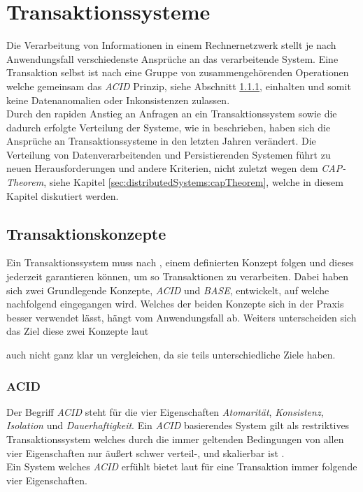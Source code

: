 \chapter{Transaktionssysteme}
Die Verarbeitung von Informationen in einem Rechnernetzwerk stellt je nach Anwendungsfall verschiedenste Ansprüche an das verarbeitende System. Eine Transaktion selbst ist nach \cite{rahm1993HochleistungsTransaktionssysteme} eine Gruppe von zusammengehörenden Operationen welche gemeinsam das \textit{ACID} Prinzip, siehe Abschnitt \ref{sec:transactionTheory:acid}, einhalten und somit keine Datenanomalien oder Inkonsistenzen zulassen. \\
Durch den rapiden Anstieg an Anfragen an ein Transaktionssystem sowie die dadurch erfolgte Verteilung der Systeme, wie in \cite{li2017research} beschrieben, haben sich die Ansprüche an Transaktionssysteme in den letzten Jahren verändert. Die Verteilung von Datenverarbeitenden und Persistierenden Systemen führt zu neuen Herausforderungen und andere Kriterien, nicht zuletzt wegen dem \textit{CAP-Theorem}, siehe Kapitel \ref{sec:distributedSystems:capTheorem}, welche in diesem Kapitel diskutiert werden. 

\section{Transaktionskonzepte}
Ein Transaktionssystem muss nach \cite{rahm1993HochleistungsTransaktionssysteme}, einem definierten Konzept folgen und dieses jederzeit garantieren können, um so Transaktionen zu verarbeiten. Dabei haben sich zwei Grundlegende Konzepte, \textit{ACID} und \textit{BASE}, entwickelt, auf welche nachfolgend eingegangen wird. Welches der beiden Konzepte sich in der Praxis besser verwendet lässt, hängt vom Anwendungsfall ab. Weiters
unterscheiden sich das Ziel diese zwei Konzepte laut \cite{EdlichFriedlandHampeBrauer201010}  

auch nicht ganz klar un vergleichen, da sie teils unterschiedliche Ziele haben.

\subsection{ACID}\label{sec:transactionTheory:acid}
Der Begriff \textit{ACID} steht für die vier Eigenschaften \textit{Atomarität}, \textit{Konsistenz}, \textit{Isolation} und \textit{Dauerhaftigkeit}. Ein \textit{ACID} basierendes System gilt als restriktives Transaktionssystem welches durch die immer geltenden Bedingungen von allen vier Eigenschaften nur äußert schwer verteil-, und skalierbar ist \cite{PritchettBASE}.\\
Ein System welches \textit{ACID} erfühlt bietet laut \cite{haerder198Acid} für eine Transaktion immer folgende vier Eigenschaften.


